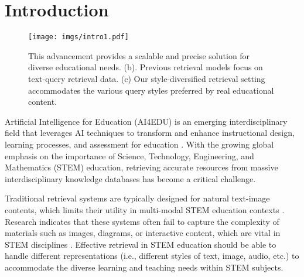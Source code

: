 \section{Introduction}
\label{sec:introduction}
\begin{figure*}[t]
    \centering
    \texttt{[image: imgs/intro1.pdf]}
    \caption{This advancement provides a scalable and precise solution for diverse educational needs. (b). Previous retrieval models focus on text-query retrieval data. (c) Our style-diversified retrieval setting accommodates the various query styles preferred by real educational content.}%
    \label{fig:motivation}
    \vspace{-5mm}
\end{figure*}

Artificial Intelligence for Education (AI4EDU) is an emerging interdisciplinary field that leverages AI techniques to transform and enhance instructional design, learning processes, and assessment for education \cite{hwang2020vision}.
With the growing global emphasis on the importance of Science, Technology, Engineering, and Mathematics (STEM) education, retrieving accurate resources from massive interdisciplinary knowledge databases has become a critical challenge. 

Traditional retrieval systems are typically designed for natural text-image contents, which limits their utility in multi-modal STEM education contexts \cite{li2024alleviating,wang2023improving}. Research indicates that these systems often fail to capture the complexity of materials such as images, diagrams, or interactive content, which are vital in STEM disciplines \cite{intro3}. Effective retrieval in STEM education should be able to handle different representations (i.e., different styles of text, image, audio, etc.) to accommodate the diverse learning and teaching needs within STEM subjects. 

